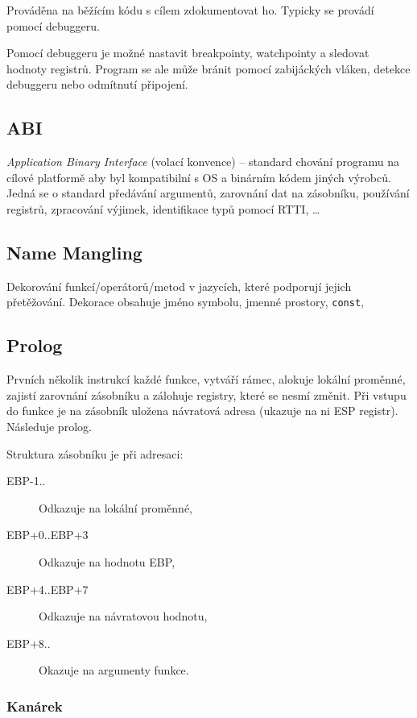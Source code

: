 Prováděna na běžícím kódu s cílem zdokumentovat ho.
Typicky se provádí pomocí debuggeru.

Pomocí debuggeru je možné nastavit breakpointy, watchpointy a sledovat hodnoty registrů.
Program se ale může bránit pomocí zabijáckých vláken, detekce debuggeru nebo odmítnutí připojení.

\subsection*{ABI}

\textit{Application Binary Interface} (volací konvence) -- standard chování programu na cílové platformě aby byl kompatibilní s OS a binárním kódem jiných výrobců.
Jedná se o standard předávání argumentů, zarovnání dat na zásobníku, používání registrů, zpracování výjimek, identifikace typů pomocí RTTI, \dots

\subsection*{Name Mangling}

Dekorování funkcí/operátorů/metod v jazycích, které podporují jejich přetěžování.
Dekorace obsahuje jméno symbolu, jmenné prostory, \texttt{const}, 

\subsection*{Prolog}

Prvních několik instrukcí každé funkce, vytváří rámec, alokuje lokální proměnné, zajistí zarovnání zásobníku a zálohuje registry, které se nesmí změnit.
Při vstupu do funkce je na zásobník uložena návratová adresa (ukazuje na ni ESP registr).
Následuje prolog.

Struktura zásobníku je při adresaci:
\begin{description}
    \item[EBP-1..] Odkazuje na lokální proměnné,
    \item[EBP+0..EBP+3] Odkazuje na hodnotu EBP,
    \item[EBP+4..EBP+7] Odkazuje na návratovou hodnotu,
    \item[EBP+8..] Okazuje na argumenty funkce.    
\end{description}

\subsubsection*{Kanárek}

